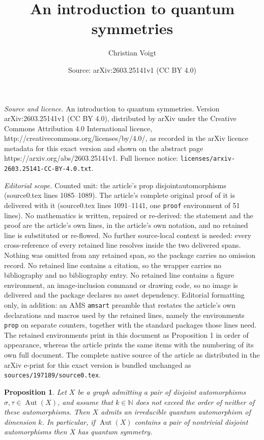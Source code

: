 \documentclass[10pt,a4paper]{amsart}
\title{An introduction to quantum symmetries}
\author{Christian Voigt}
\date{Source: arXiv:2603.25141v1 (CC BY 4.0)}
\newtheorem{prop}{Proposition}
\DeclareMathOperator{\Aut}{Aut}
\begin{document}
\maketitle

\noindent\emph{Source and licence.} An introduction to quantum symmetries. Version arXiv:2603.25141v1 (CC BY 4.0), distributed by arXiv under the Creative Commons Attribution 4.0 International licence, http://creativecommons.org/licenses/by/4.0/, as recorded in the arXiv licence metadata for this exact version and shown on the abstract page https://arxiv.org/abs/2603.25141v1. Full licence notice: \texttt{licenses/arxiv-2603.25141-CC-BY-4.0.txt}.\par\smallskip

\noindent\textit{Editorial scope.} Counted unit: the article's prop disjointautomorphisms (source0.tex lines 1085--1089). The article's complete original proof of it is delivered with it (source0.tex lines 1091--1141, one \texttt{proof} environment of 51 lines). No mathematics is written, repaired or re-derived: the statement and the proof are the article's own lines, in the article's own notation, and no retained line is substituted or re-flowed.  No further source-local context is needed: every cross-reference of every retained line resolves inside the two delivered spans.  Nothing was omitted from any retained span, so the package carries no omission record.  No retained line contains a citation, so the wrapper carries no bibliography and no bibliography entry.  No retained line contains a figure environment, an image-inclusion command or drawing code, so no image is delivered and the package declares no asset dependency.  Editorial formatting only, in addition: an AMS \texttt{amsart} preamble that restates the article's own declarations and macros used by the retained lines, namely the environments \texttt{prop} on separate counters, together with the standard packages those lines need.  The retained environments print in this document as Proposition 1 in order of appearance, whereas the article prints the same items with the numbering of its own full document.  The complete native source of the article as distributed in the arXiv e-print for this exact version is bundled unchanged as \texttt{sources/197189/source0.tex}.
\begin{prop} \label{disjointautomorphisms}
Let $ X $ be a graph admitting a pair of disjoint automorphisms $ \sigma, \tau \in \Aut(X) $, and assume that $ k \in \mathbb{N} $ does not exceed the order
of neither of these automorphisms. Then $ X $ admits an irreducible quantum automorphism of dimension $ k $. In particular, if $ \Aut(X) $ contains a pair of nontrivial 
disjoint automorphisms then $ X $ has quantum symmetry. 
\end{prop} 
\end{document}
